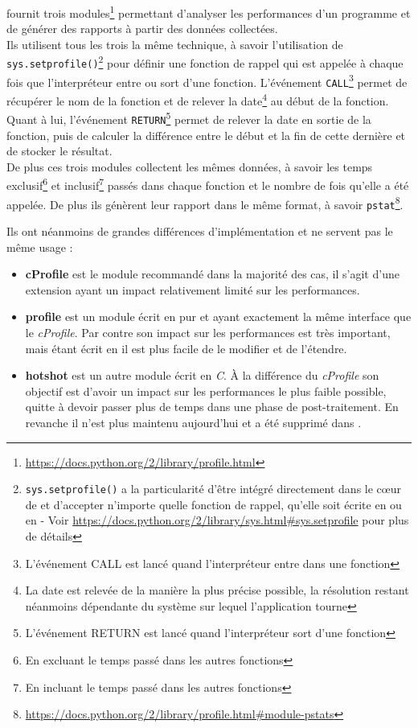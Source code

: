\Python fournit trois modules\footnote{\url{https://docs.python.org/2/library/profile.html}} permettant d'analyser les performances d'un programme et de générer des rapports à partir des données collectées.\\
Ils utilisent tous les trois la même technique, à savoir l'utilisation de \verb|sys.setprofile()|\footnote{\verb?sys.setprofile()? a la particularité d'être intégré directement dans le cœur de \Python et d'accepter n'importe quelle fonction de rappel, qu'elle soit écrite en \C ou en \Python - Voir \url{https://docs.python.org/2/library/sys.html#sys.setprofile} pour plus de détails} pour définir une fonction de rappel qui est appelée à chaque fois que l'interpréteur entre ou sort d'une fonction.
L'événement \verb|CALL|\footnote{L'événement CALL est lancé quand l'interpréteur entre dans une fonction} permet de récupérer le nom de la fonction et de relever la date\footnote{La date est relevée de la manière la plus précise possible, la résolution restant néanmoins dépendante du système sur lequel l'application tourne} au début de la fonction. Quant à lui, l'événement \verb|RETURN|\footnote{L'événement RETURN est lancé quand l'interpréteur sort d'une fonction} permet de relever la date en sortie de la fonction, puis de calculer la différence entre le début et la fin de cette dernière et de stocker le résultat. \\
De plus ces trois modules collectent les mêmes données, à savoir les temps exclusif\footnote{En excluant le temps passé dans les autres fonctions} et inclusif\footnote{En incluant le temps passé dans les autres fonctions} passés dans chaque fonction et le nombre de fois qu'elle a été appelée. De plus ils génèrent leur rapport dans le même format, à savoir \verb|pstat|\footnote{\url{https://docs.python.org/2/library/profile.html#module-pstats}}. 

Ils ont néanmoins de grandes différences d'implémentation et ne servent pas le même usage : 
\begin{itemize}
\item \textbf{cProfile} est le module recommandé dans la majorité des cas, il s'agit d'une extension \C ayant un impact relativement limité sur les performances.
\item \textbf{profile} est un module écrit en pur \Python et ayant exactement la même interface que le \emph{cProfile}. Par contre son impact sur les performances est très important, mais étant écrit en \Python il est plus facile de le modifier et de l'étendre.
\item \textbf{hotshot} est un autre module écrit en \emph{C}. À la différence du \emph{cProfile} son objectif est d'avoir un impact sur les performances le plus faible possible, quitte à devoir passer plus de temps dans une phase de post-traitement. En revanche il n'est plus maintenu aujourd'hui et a été supprimé dans .
\end{itemize}

\clearpage